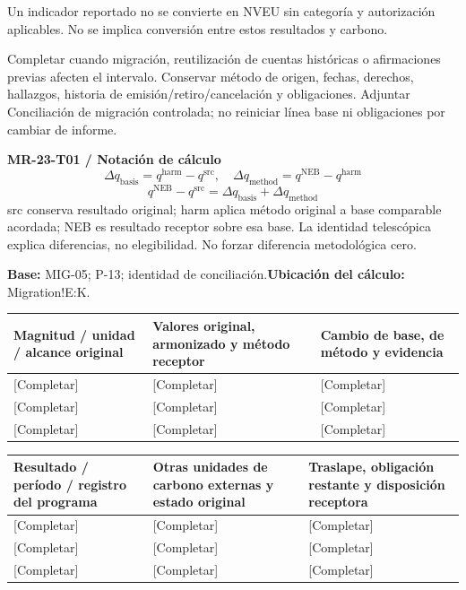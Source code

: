 Un indicador reportado no se convierte en NVEU sin categoría y autorización aplicables. No se implica conversión entre estos resultados y carbono.\par
{}
Completar cuando migración, reutilización de cuentas históricas o afirmaciones previas afecten el intervalo. Conservar método de origen, fechas, derechos, hallazgos, historia de emisión/retiro/cancelación y obligaciones. Adjuntar Conciliación de migración controlada; no reiniciar línea base ni obligaciones por cambiar de informe.\par
{}
\par\begingroup\sffamily\fontsize{8.4}{10.5}\selectfont\color{NEBGreen}
\textbf{MR-23-T01 / Notación de cálculo}\
{\fontsize{10}{12}\selectfont\[\Delta q_{\mathrm{basis}}=q^{\mathrm{harm}}-q^{\mathrm{src}},\quad \Delta q_{\mathrm{method}}=q^{\mathrm{NEB}}-q^{\mathrm{harm}}\]}
{\fontsize{10}{12}\selectfont\[q^{\mathrm{NEB}}-q^{\mathrm{src}}=\Delta q_{\mathrm{basis}}+\Delta q_{\mathrm{method}}\]}
src conserva resultado original; harm aplica método original a base comparable acordada; NEB es resultado receptor sobre esa base. La identidad telescópica explica diferencias, no elegibilidad. No forzar diferencia metodológica cero.\par
\textbf{Base:} MIG-05; P-13; identidad de conciliación.\quad\textbf{Ubicación del cálculo:} Migration!E:K.\par\endgroup
{\sffamily\fontsize{8.6}{10.7}\selectfont\begin{longtable}{@{}P{48mm}P{61mm}P{53mm}@{}}
\toprule
\textbf{Magnitud / unidad / alcance original} & \textbf{Valores original, armonizado y método receptor} & \textbf{Cambio de base, de método y evidencia}\\\midrule\endhead
\rule{0pt}{8mm}[Completar] & [Completar] & [Completar]\\\hline
\rule{0pt}{8mm}[Completar] & [Completar] & [Completar]\\\hline
\rule{0pt}{8mm}[Completar] & [Completar] & [Completar]\\\hline
\end{longtable}}
{\sffamily\fontsize{8.6}{10.7}\selectfont\begin{longtable}{@{}P{48mm}P{61mm}P{53mm}@{}}
\toprule
\textbf{Resultado / período / registro del programa} & \textbf{Otras unidades de carbono externas y estado original} & \textbf{Traslape, obligación restante y disposición receptora}\\\midrule\endhead
\rule{0pt}{8mm}[Completar] & [Completar] & [Completar]\\\hline
\rule{0pt}{8mm}[Completar] & [Completar] & [Completar]\\\hline
\rule{0pt}{8mm}[Completar] & [Completar] & [Completar]\\\hline
\end{longtable}}
